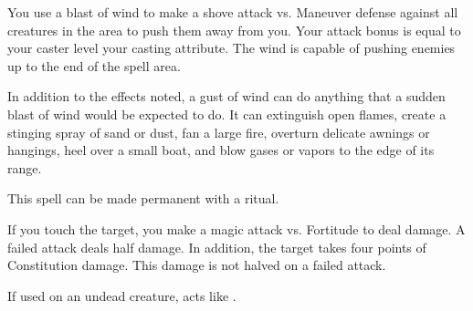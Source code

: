 \begin{spelleffect}
    You use a blast of wind to make a shove attack vs. Maneuver defense against all creatures in the area to push them away from you. Your attack bonus is equal to your caster level \add your casting attribute. The wind is capable of pushing enemies up to the end of the spell area. 
    \par In addition to the effects noted, a gust of wind can do anything that a sudden blast of wind would be expected to do. It can extinguish open flames, create a stinging spray of sand or dust, fan a large fire, overturn delicate awnings or hangings, heel over a small boat, and blow gases or vapors to the edge of its range.
\end{spelleffect}
\begin{spellnotes}
    This spell can be made permanent with a  ritual.
\end{spellnotes}

\begin{comment}
\subsubsection{H}
\end{comment}

\begin{spelleffect}
    If you touch the target, you make a magic attack vs. Fortitude to deal damage. A failed attack deals half damage. In addition, the target takes four points of Constitution damage. This damage is not halved on a failed attack.
\end{spelleffect}
\begin{spellnotes}
    If used on an undead creature,  acts like .
\end{spellnotes}

